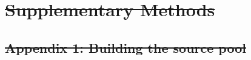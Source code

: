 \documentclass[twocolumn,preprintnumbers,amsmath,amssymb,superscriptaddress,linenumbers]{revtex4-1}
\providecommand{\DIFdel}[1]{{\protect\color{red}\sout{#1}}}                      %
\begin{document}
\section*{\DIFdel{Supplementary Methods}}


\subsection*{\DIFdel{Appendix 1: Building the source pool}}
\end{document}
